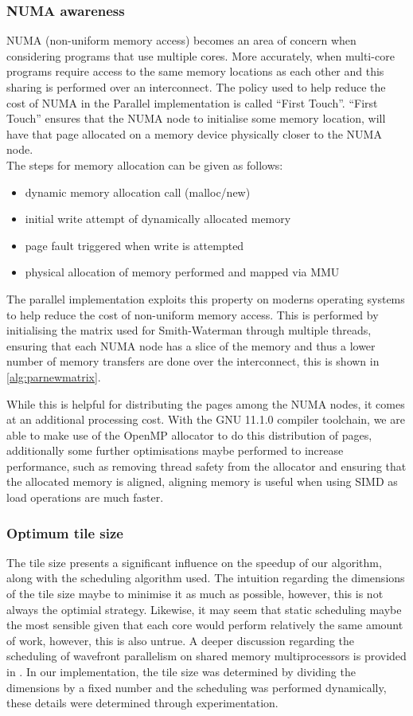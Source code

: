 \documentclass[manuscript,screen, nonacm=true]{acmart}
\begin{document}
\subsubsection{NUMA awareness}
NUMA (non-uniform memory access) becomes an area of concern when considering programs that use multiple cores. 
More accurately, when multi-core programs require access to the same memory locations as each other and this sharing is performed over an interconnect. 
The policy used to help reduce the cost of NUMA in the Parallel implementation is called ``First Touch''.
``First Touch'' ensures that the NUMA node to initialise some memory location, will have that page allocated on a memory device physically closer to the NUMA node.\\
The steps for memory allocation can be given as follows:
\begin{itemize}
	\item dynamic memory allocation call (malloc/new)
	\item initial write attempt of dynamically allocated memory
	\item page fault triggered when write is attempted
	\item physical allocation of memory performed and mapped via MMU
\end{itemize}
The parallel implementation exploits this property on moderns operating systems to help reduce the cost of non-uniform memory access. This is performed by initialising the
matrix used for Smith-Waterman through multiple threads, ensuring that each NUMA node has a slice of the memory and thus a lower number of memory transfers are done over the interconnect, this is shown in \cref{alg:parnewmatrix}. 

While this is helpful for distributing the pages among the NUMA nodes, it comes at an additional processing cost. With the GNU 11.1.0 compiler toolchain, we are able to make use of the OpenMP allocator to do this distribution of pages, additionally some further optimisations maybe performed to increase performance, such as removing thread safety from the allocator and ensuring that the allocated memory is aligned, aligning memory is useful when using SIMD as load operations are much faster. 


\subsubsection{Optimum tile size}
The tile size presents a significant influence on the speedup of our algorithm, along with the scheduling algorithm used. The intuition regarding the dimensions of the tile size maybe to minimise it as much as possible, however, this is not always the optimial strategy. Likewise, it may seem that static scheduling maybe the most sensible given that each core would perform relatively the same amount of work, however, this is also untrue. A deeper discussion regarding the scheduling of wavefront parallelism on shared memory multiprocessors is provided in \cite{manjikian1996scheduling}. In our implementation, the tile size was determined by dividing the dimensions by a fixed number and the scheduling was performed dynamically, these details were determined through experimentation. 
\end{document}
